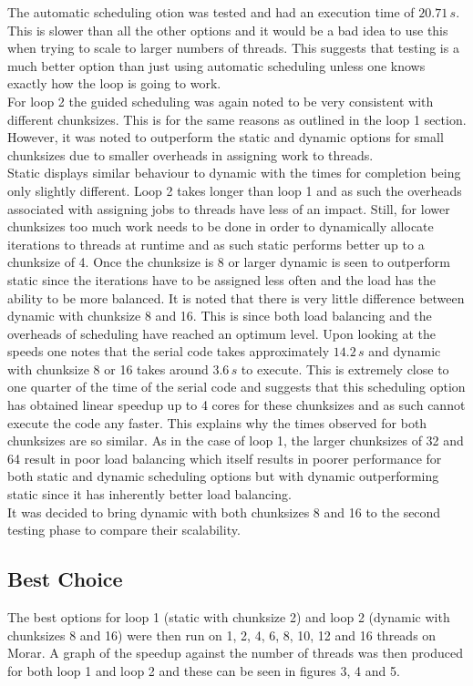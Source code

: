 \documentclass[12pt]{article}    %
\numberwithin{equation}{section}
\begin{document}
The automatic scheduling otion was tested and had an execution time of $20.71\,s$.
This is slower than all the other options and it would be a bad idea to use this when trying to scale to larger numbers of threads.
This suggests that testing is a much better option than just using automatic scheduling unless one knows exactly how the loop is going to work.\\

For loop 2 the guided scheduling was again noted to be very consistent with different chunksizes.
This is for the same reasons as outlined in the loop 1 section.
However, it was noted to outperform the static and dynamic options for small chunksizes due to smaller overheads in assigning work to threads.\\

Static displays similar behaviour to dynamic with the times for completion being only slightly different.
Loop 2 takes longer than loop 1 and as such the overheads associated with assigning jobs to threads have less of an impact.
Still, for lower chunksizes too much work needs to be done in order to dynamically allocate iterations to threads at runtime and as such static performs better up to a chunksize of 4.
Once the chunksize is 8 or larger dynamic is seen to outperform static since the iterations have to be assigned less often and the load has the ability to be more balanced.
It is noted that there is very little difference between dynamic with chunksize 8 and 16.
This is since both load balancing and the overheads of scheduling have reached an optimum level.
Upon looking at the speeds one notes that the serial code takes approximately $14.2\,s$ and dynamic with chunksize 8 or 16 takes around $3.6\,s$ to execute.
This is extremely close to one quarter of the time of the serial code and suggests that this scheduling option has obtained linear speedup up to 4 cores for these chunksizes and as such cannot execute the code any faster.
This explains why the times observed for both chunksizes are so similar.
As in the case of loop 1, the larger chunksizes of 32 and 64 result in poor load balancing which itself results in poorer performance for both static and dynamic scheduling options but with dynamic outperforming static since it has inherently better load balancing.\\
It was decided to bring dynamic with both chunksizes 8 and 16 to the second testing phase to compare their scalability.\\

\subsection{Best Choice}
The best options for loop 1 (static with chunksize 2) and loop 2 (dynamic with chunksizes 8 and 16) were then run on 1, 2, 4, 6, 8, 10, 12 and 16 threads on Morar.
A graph of the speedup against the number of threads was then produced for both loop 1 and loop 2 and these can be seen in figures 3, 4 and 5.
\end{document}
